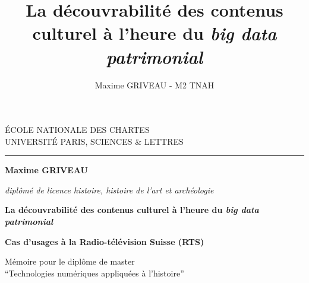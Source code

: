 \documentclass[a4paper,12pt,twoside]{book}
\author{Maxime GRIVEAU - M2 TNAH}
\title{La découvrabilité des contenus culturel à l'heure du \textit{big data patrimonial}}
\begin{document}
	\begin{titlepage}
		\begin{center}
			
			\bigskip
			
			\begin{large}				
				ÉCOLE NATIONALE DES CHARTES\\
				UNIVERSITÉ PARIS, SCIENCES \& LETTRES
			\end{large}
			\begin{center}\rule{2cm}{0.02cm}\end{center}
			
			\bigskip
			\bigskip
			\bigskip
			\begin{Large}
				\textbf{Maxime GRIVEAU}\\
			\end{Large}
			\begin{normalsize} 
				\textit{diplômé de licence histoire, histoire de l'art et archéologie}
			\end{normalsize}
			
			\bigskip
			\bigskip
			\bigskip
			
			\begin{Huge}
				\textbf{La découvrabilité des contenus culturel à l'heure du \textit{big data patrimonial}}\\
			\end{Huge}
			\bigskip
			\bigskip
			\begin{LARGE}
				\textbf{Cas d'usages à la Radio-télévision Suisse (RTS)}\\
			\end{LARGE}
			
			\bigskip
			\bigskip
			\bigskip
			\begin{large}
			\end{large}
			\vfill
			
			\begin{large}
				Mémoire 
				pour le diplôme de master \\
				\enquote{Technologies numériques appliquées à l'histoire} \\
			\end{large}
			
		\end{center}
	\end{titlepage}
	
	\thispagestyle{empty}	
	\cleardoublepage
	
	\frontmatter
	
\end{document}
